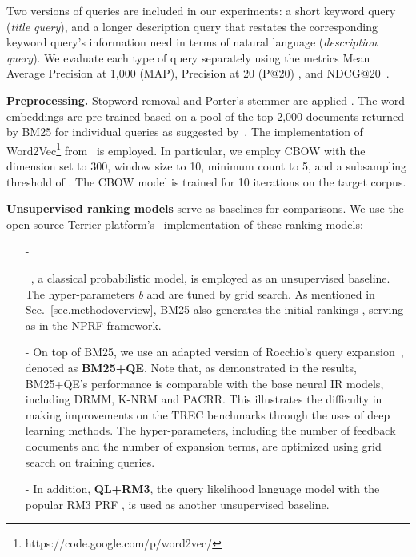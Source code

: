 \documentclass[11pt,a4paper]{article}
\begin{document}
Two versions of queries are included in our experiments: a short keyword query (\textit{title query}), and a longer description query that restates the corresponding keyword query's information need in terms of natural language (\textit{description query}). We evaluate each type of query separately using the metrics Mean Average Precision at 1,000 (MAP), Precision at 20 (P@20) \cite{DBLP:books/daglib/0021593}, and NDCG@20~\cite{Jarvelin:2002:CGE:582415.582418}.

\noindent \textbf{Preprocessing.} Stopword removal and Porter's stemmer are applied \cite{DBLP:books/daglib/0021593}. The word embeddings are pre-trained based on 
a pool of the top 2,000 documents returned by BM25 for individual queries
as suggested by~\cite{DBLP:conf/acl/0001MC16}.
The implementation of Word2Vec\footnote{https://code.google.com/p/word2vec/} 
from~\cite{word2vec} is employed.
In particular, we employ CBOW with the dimension set to 300, window size to 10, minimum count to 5,
and a subsampling threshold of .
The CBOW model is trained for 10 iterations on the target corpus.



\noindent\textbf{Unsupervised ranking models} serve as baselines for comparisons. We use the open source Terrier platform's~\cite{terrier12osir} implementation of these ranking models:

\begin{itemize}[leftmargin=*]
\item[-] 

~\cite{DBLP:conf/trec/RobertsonWHGP95}, a classical probabilistic model, is employed as an unsupervised baseline. The hyper-parameters {\em b} and {\em } are tuned by grid search. As mentioned in Sec.~\ref{sec.methodoverview}, BM25 also generates the initial rankings , serving as  in the NPRF framework.

\item[-] 
\noindent On top of BM25, we use an adapted version of Rocchio's query expansion~\cite{DBLP:conf/trec/YeHHYL09}, denoted as {\bf BM25+QE}. 
Note that, as demonstrated in the results, BM25+QE's performance is comparable with the base neural IR models, including DRMM, K-NRM and PACRR. This illustrates
the difficulty in making improvements on the TREC benchmarks
through the uses of deep learning methods.
The hyper-parameters, including
the number of feedback documents and the number of expansion terms, are optimized using grid search on training queries.

\item[-] 
\noindent In addition, {\bf QL+RM3}, the query likelihood language model with the popular RM3 PRF \cite{DBLP:conf/sigir/LavrenkoC01}, is used as another unsupervised baseline.

\end{itemize}
\end{document}
